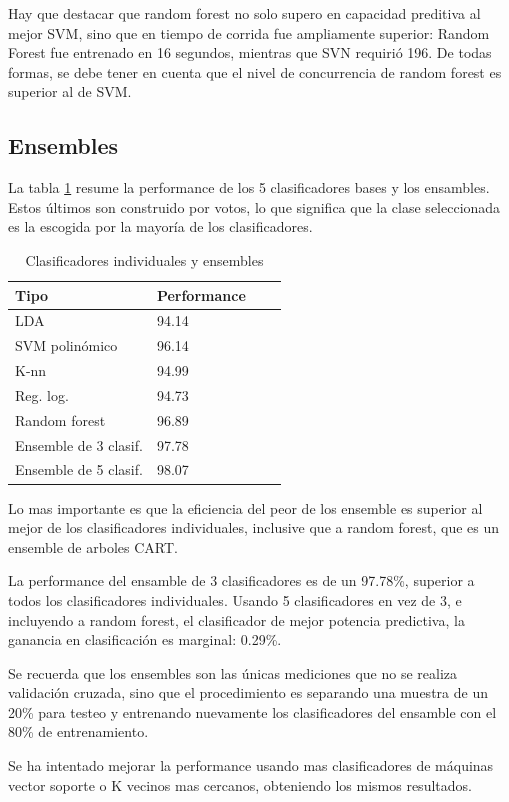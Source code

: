 \documentclass[journal]{IEEEtran}
\begin{document}
Hay que destacar que random forest no solo supero en capacidad preditiva
al mejor SVM, sino que en tiempo de corrida fue ampliamente superior:
Random Forest fue entrenado en 16 segundos, mientras que SVN requirió
196. De todas formas, se debe tener en cuenta que el nivel de
concurrencia de random forest es superior al de SVM.

\subsection{Ensembles}
La tabla \ref{table:ensemble_summary} resume la performance
de los 5 clasificadores bases y los ensambles. 
Estos últimos son construido por votos, lo que
significa que la clase seleccionada es la escogida por la mayoría 
de los clasificadores.

\begin{table}[ht!]
\caption{Clasificadores individuales y ensembles}
\label{table:ensemble_summary}
\centering
\begin{tabular}{l | l l l }
Tipo & Performance  \\
\hline
LDA & 94.14 \\
SVM polinómico & 96.14 \\
K-nn & 94.99 \\
Reg. log. & 94.73 \\
Random forest & 96.89 \\
\hline
Ensemble de 3 clasif. & 97.78 \\
Ensemble de 5 clasif. & 98.07 \\
\end{tabular}
\end{table}

Lo mas importante es que la eficiencia del peor de los ensemble
es superior al mejor de los clasificadores individuales, inclusive
que a random forest, que es un ensemble de arboles CART.

La performance del ensamble de 3 clasificadores es de un 97.78\%, 
superior a todos los clasificadores individuales. Usando
5 clasificadores en vez de 3, e incluyendo a random forest, el clasificador de 
mejor potencia predictiva, la ganancia en clasificación es marginal: 0.29\%.

Se recuerda que los ensembles son las únicas
mediciones que no se realiza validación cruzada, sino que el 
procedimiento es separando una muestra de un 20\% para testeo y
entrenando nuevamente  los clasificadores del ensamble con el 80\%
de entrenamiento.

Se ha intentado mejorar la performance usando mas clasificadores de
máquinas vector soporte o K vecinos mas cercanos, obteniendo los
mismos resultados. 
\end{document}
